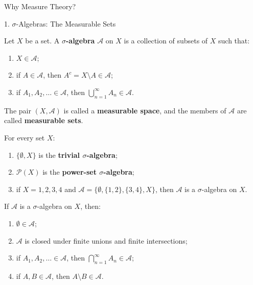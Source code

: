 \documentclass[12pt,a4paper]{article}
\begin{document}
\FrontPage
\Large

\begin{heading}
    Why Measure Theory?
\end{heading}

\clearpage

\begin{heading}
    1. $\sigma$-Algebras: The Measurable Sets
\end{heading}

\vspace{10pt}

\begin{definition}
    Let $X$ be a set. A \textbf{$\sigma$-algebra} $\mathcal{A}$ on $X$ is a collection of subsets of $X$ such that:
    \begin{enumerate}
        \item $X\in\mathcal{A}$;
        \item if $A\in\mathcal{A}$, then $A^c=X\setminus A\in\mathcal{A}$;
        \item if $A_1,A_2,\ldots\in\mathcal{A}$, then
        $\displaystyle \bigcup_{n=1}^{\infty}A_n\in\mathcal{A}$.
    \end{enumerate}
    The pair $(X,\mathcal{A})$ is called a \textbf{measurable space}, and the members of $\mathcal{A}$ are called \textbf{measurable sets}.
\end{definition}

\clearpage

\begin{definition}
    For every set $X$:
    \begin{enumerate}
        \item $\{\emptyset,X\}$ is the \textbf{trivial $\sigma$-algebra};
        \item $\mathcal{P}(X)$ is the \textbf{power-set $\sigma$-algebra};
        \item if $X={1,2,3,4}$ and $\mathcal{A}=\{\emptyset,\{1,2\},\{3,4\},X\}$, then $\mathcal{A}$ is a $\sigma$-algebra on $X$.
    \end{enumerate}
\end{definition}

\clearpage

\begin{theorem}
    If $\mathcal{A}$ is a $\sigma$-algebra on $X$, then:
    \begin{enumerate}
        \item $\emptyset\in\mathcal{A}$;
        \item $\mathcal{A}$ is closed under finite unions and finite intersections;
        \item if $A_1,A_2,\ldots\in\mathcal{A}$, then
        $\displaystyle \bigcap_{n=1}^{\infty}A_n\in\mathcal{A}$;
        \item if $A,B\in\mathcal{A}$, then $A\setminus B\in\mathcal{A}$.
    \end{enumerate}
\end{theorem}
\end{document}
